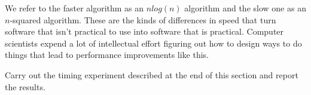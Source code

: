 We refer to the faster algorithm as an $n log(n)$ algorithm
and the slow one as an $n$-squared algorithm.
These are the kinds of differences in speed that turn
software that isn't practical to use
into software that is practical.
Computer scientists expend a lot of intellectual effort
figuring out how to design ways to do things that lead
to performance improvements like this.

\begin{ExerciseList}
\Exercise Carry out the timing experiment described at
the end of this section and report the results.
\end{ExerciseList}


